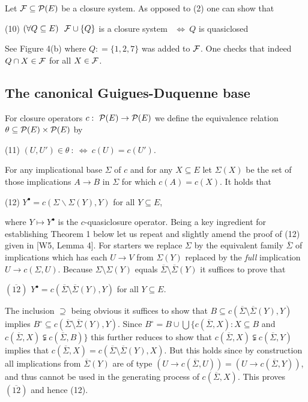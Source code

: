 \documentclass[11pt]{article}
\newcommand{\ol}{\overline}
\newcommand{\ra}{\rightarrow}
\begin{document}
Let ${\cal F} \subseteq {\cal P}(E)$ be a closure system. As opposed to (2) one can show that

(10) \quad $(\forall Q \subseteq E) \ \ {\cal F} \cup \{Q\}$ is a closure system \ $\Leftrightarrow \ Q$ is quasiclosed

See Figure 4(b) where $Q : = \{1, 2, 7\}$ was added to ${\cal F}$. One checks that indeed $Q \cap X \in {\cal F}$ for all $X \in {\cal F}$.





\subsection{The canonical Guigues-Duquenne base}


For closure operators $c: \ {\cal P}(E) \ra {\cal P}(E)$ we define the equivalence relation $\theta \subseteq {\cal P}(E) \times {\cal P}(E)$ by

(11) \quad $(U, U') \in \theta \ : \ \Leftrightarrow \ c(U) = c(U')$.



For any implicational base $\Sigma$ of $c$ and for any $X \subseteq E$ let $\Sigma (X)$ be the set of those implications $A \ra B$  in $\Sigma$ for which $c(A) = c(X)$. It holds that

(12) \quad $Y^\bullet = c(\Sigma \backslash \Sigma (Y), Y)$ \quad for all \quad $Y \subseteq E$,

where $Y \mapsto Y^\bullet$ is the $c$-quasiclosure operator. Being a key ingredient for establishing Theorem 1 below let us repeat and slightly amend the proof of (12) given in [W5, Lemma 4]. For starters we replace  $\Sigma$ by the equivalent family  $\ol{\Sigma}$ of  implications which has each $U \ra V$ from $\Sigma (Y)$ replaced by the {\it full} implication $U \ra c(\Sigma, U)$. Because $\Sigma \setminus \Sigma (Y)$ equals $\ol{\Sigma} \setminus \ol{\Sigma}(Y)$ it suffices to prove that

$(\ol{12})$ \quad $Y^\bullet = c(\ol{\Sigma} \setminus \ol{\Sigma} (Y), Y)$ for all $Y \subseteq E$.

The inclusion $\supseteq$ being obvious  it suffices to show that $B \subseteq c(\ol{\Sigma} \setminus \ol{\Sigma}(Y), Y)$ implies $B^\circ \subseteq c(\ol{\Sigma} \setminus \ol{\Sigma}(Y), Y)$. Since $B^\circ= B \cup \bigcup \{c(\ol{\Sigma}, X): X \subseteq B$  and $c (\ol{\Sigma}, X) \subsetneqq c(\ol{\Sigma}, B)\}$ this further reduces to show that $c(\ol{\Sigma}, X) \subsetneqq c(\ol{\Sigma}, Y)$ implies that $c(\ol{\Sigma}, X) = c(\ol{\Sigma} \setminus \ol{\Sigma}(Y), X)$. But this holds since by construction all implications from $\ol{\Sigma} (Y)$ are of type $(U \ra c(\ol{\Sigma}, U)) = (U \ra c(\ol{\Sigma}, Y))$, and thus cannot be used in the generating process of $c(\ol{\Sigma}, X)$. This proves $(\ol{12})$ and hence (12).
\end{document}
